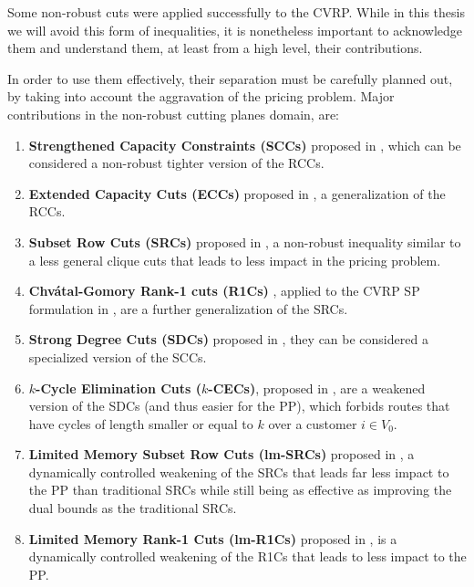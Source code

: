Some non-robust cuts were applied successfully to the CVRP.
While in this thesis we will avoid this form of inequalities,
it is nonetheless important to acknowledge them and understand
them, at least from a high level, their contributions.

In order to use them effectively, their separation must be carefully
planned out, by taking into account the aggravation of the pricing problem.
Major contributions in the non-robust cutting planes domain, are:

\begin{enumerate}
    \setlength{\itemsep}{0pt}

    \item \textbf{Strengthened Capacity Constraints (SCCs)} proposed in \textcite{baldacci2008},
        which can be considered a non-robust tighter version of the RCCs.
    \item \textbf{Extended Capacity Cuts (ECCs)} proposed in \textcite{pessoa2008a, pessoa2009}, a
        generalization of the RCCs.
    \item \textbf{Subset Row Cuts (SRCs)} proposed in \textcite{jepsen2008a}, a non-robust
        inequality similar to a less general clique cuts that leads to less impact in the pricing problem.
    \item \textbf{Chv\'atal-Gomory Rank-1 cuts (R1Cs)} \parencite{chvatal1973}, applied to the CVRP SP formulation
        in \textcite{petersen2008}, are a further generalization of the SRCs.
    \item \textbf{Strong Degree Cuts (SDCs)} proposed in \textcite{contardo2011}, they can be considered
        a specialized version of the SCCs.
    \item \textbf{$k$-Cycle Elimination Cuts ($k$-CECs)}, proposed in \textcite{contardo2014},
        are a weakened version of the SDCs (and thus easier for the PP), which forbids
        routes that have cycles of length smaller or equal to $k$ over a customer $i \in V_0$.
    \item \textbf{Limited Memory Subset Row Cuts (lm-SRCs)} proposed in \textcite{pecin2017},
         a dynamically controlled weakening of the SRCs that leads far less impact to
         the PP than traditional
         SRCs while still being as effective as improving the dual bounds as the traditional SRCs.
    \item \textbf{Limited Memory Rank-1 Cuts (lm-R1Cs)} proposed in \textcite{pecin2017a},
        is a dynamically controlled weakening of the R1Cs that leads to less impact to the PP.
\end{enumerate}



